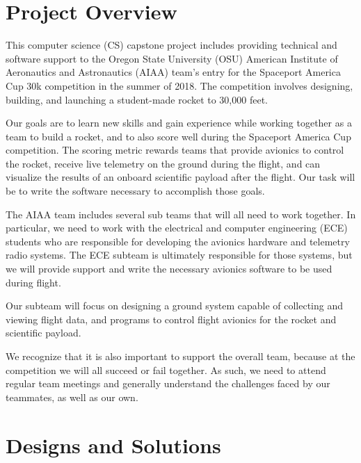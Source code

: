 \documentclass[onecolumn, draftclsnofoot, 10pt, compsoc]{IEEEtran}
\begin{document}

\tableofcontents

\newpage
\section{Project Overview}
This computer science (CS) capstone project includes providing technical and software support to the Oregon State University (OSU) American Institute of Aeronautics and Astronautics (AIAA) team's entry for the Spaceport America Cup 30k competition in the summer of 2018.  The competition involves designing, building, and launching a student-made rocket to 30,000 feet.

Our goals are to learn new skills and gain experience while working together as a team to build a rocket, and to also score well during the Spaceport America Cup competition.  The scoring metric rewards teams that provide avionics to control the rocket, receive live telemetry on the ground during the flight, and can visualize the results of an onboard scientific payload after the flight.  Our task will be to write the software necessary to accomplish those goals.

The AIAA team includes several sub teams that will all need to work together.  In particular, we need to work with the electrical and computer engineering (ECE) students who are responsible for developing the avionics hardware and telemetry radio systems.  The ECE subteam is ultimately responsible for those systems, but we will provide support and write the necessary avionics software to be used during flight.

Our subteam will focus on designing a ground system capable of collecting and viewing flight data, and programs to control flight avionics for the rocket and scientific payload.

We recognize that it is also important to support the overall team, because at the competition we will all succeed or fail together.  As such, we need to attend regular team meetings and generally understand the challenges faced by our teammates, as well as our own.


\section{Designs and Solutions}
\end{document}
